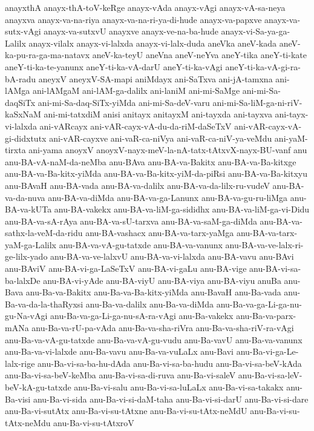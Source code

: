 {anayxthA
anayx-thA-toV-keRge
anayx-vAda
anayx-vAgi
anayx-vA-sa-neya
anayxva
anayx-va-na-riya
anayx-va-na-ri-ya-di-hude
anayx-va-papxve
anayx-va-sutx-vAgi
anayx-va-sutxvU
anayxve
anayx-ve-na-ba-hude
anayx-vi-Sa-ya-ga-Lalilx
anayx-vilalx
anayx-vi-lalxda
anayx-vi-lalx-duda
aneVka
aneV-kada
aneV-ka-pu-ra-ga-ma-natavx
aneV-ka-teyU
aneVna
aneV-neYva
aneY-tika
aneY-ti-kate
aneY-ti-ka-te-yanunx
aneY-ti-ka-vA-darU
aneY-ti-ka-vAgi
aneY-ti-ka-vA-gi-ra-bA-radu
aneyxV
aneyxV-SA-mapi
aniMdayx
ani-SaTxva
ani-jA-tamxna
ani-lAMga
ani-lAMgaM
ani-lAM-ga-dalilx
ani-laniM
ani-mi-SaMge
ani-mi-Sa-daqSiTx
ani-mi-Sa-daq-SiTx-yiMda
ani-mi-Sa-deV-varu
ani-mi-Sa-liM-ga-ni-riV-kaSxNaM
ani-mi-tatxdiM
anisi
anitayx
anitayxM
ani-tayxda
ani-tayxva
ani-tayx-vi-lalxda
ani-vARcayx
ani-vAR-cayx-vA-du-da-riM-daSeTxV
ani-vAR-cayx-vA-gi-didxtutx
ani-vAR-cayxve
ani-vaR-ca-niVya
ani-vaR-ca-niV-ya-veMdu
ani-yaM-tirxta
ani-yama
anoyxV
anoyxV-nayx-meV-la-nA-tatx-tAtxvX-nayx-BU-vanf
anu
anu-BA-vA-naM-da-neMba
anu-BAva
anu-BA-va-Bakitx
anu-BA-va-Ba-kitxge
anu-BA-va-Ba-kitx-yiMda
anu-BA-va-Ba-kitx-yiM-da-piRsi
anu-BA-va-Ba-kitxyu
anu-BAvaH
anu-BA-vada
anu-BA-va-dalilx
anu-BA-va-da-lilx-ru-vudeV
anu-BA-va-da-nuva
anu-BA-va-diMda
anu-BA-va-ga-Lanunx
anu-BA-va-gu-ru-liMga
anu-BA-va-kUTa
anu-BA-vakekx
anu-BA-va-liM-ga-sididhx
anu-BA-va-liM-ga-vi-Didu
anu-BA-va-sA-rAya
anu-BA-va-sU-tarxva
anu-BA-va-saM-ga-diMda
anu-BA-va-sathx-la-veM-da-ridu
anu-BA-vashacx
anu-BA-va-tarx-yaMga
anu-BA-va-tarx-yaM-ga-Lalilx
anu-BA-va-vA-gu-tatxde
anu-BA-va-vanunx
anu-BA-va-ve-lalx-ri-ge-lilx-yado
anu-BA-va-ve-lalxvU
anu-BA-va-vi-lalxda
anu-BA-vavu
anu-BAvi
anu-BAviV
anu-BA-vi-ga-LaSeTxV
anu-BA-vi-gaLu
anu-BA-vige
anu-BA-vi-sa-ba-lalxDe
anu-BA-vi-yAde
anu-BA-viyU
anu-BA-viya
anu-BA-viyu
anuBa
anu-Bava
anu-Ba-va-Bakitx
anu-Ba-va-Ba-kitx-yiMda
anu-BavaH
anu-Ba-vada
anu-Ba-va-da-la-thaRyxsi
anu-Ba-va-dalilx
anu-Ba-va-diMda
anu-Ba-va-ga-Li-ga-nu-gu-Na-vAgi
anu-Ba-va-ga-Li-ga-nu-sA-ra-vAgi
anu-Ba-vakekx
anu-Ba-va-parx-mANa
anu-Ba-va-rU-pa-vAda
anu-Ba-va-sha-riVra
anu-Ba-va-sha-riV-ra-vAgi
anu-Ba-va-vA-gu-tatxde
anu-Ba-va-vA-gu-vudu
anu-Ba-vavU
anu-Ba-va-vanunx
anu-Ba-va-vi-lalxde
anu-Ba-vavu
anu-Ba-va-vuLaLx
anu-Bavi
anu-Ba-vi-ga-Le-lalx-rige
anu-Ba-vi-sa-ba-hu-dAda
anu-Ba-vi-sa-ba-hudu
anu-Ba-vi-sa-beV-kAda
anu-Ba-vi-sa-beV-keMba
anu-Ba-vi-sa-di-ruva
anu-Ba-vi-saleV
anu-Ba-vi-sa-leV-beV-kA-gu-tatxde
anu-Ba-vi-salu
anu-Ba-vi-sa-luLaLx
anu-Ba-vi-sa-takakx
anu-Ba-visi
anu-Ba-vi-sida
anu-Ba-vi-si-daM-taha
anu-Ba-vi-si-darU
anu-Ba-vi-si-dare
anu-Ba-vi-sutAtx
anu-Ba-vi-su-tAtxne
anu-Ba-vi-su-tAtx-neMdU
anu-Ba-vi-su-tAtx-neMdu
anu-Ba-vi-su-tAtxroV
}
